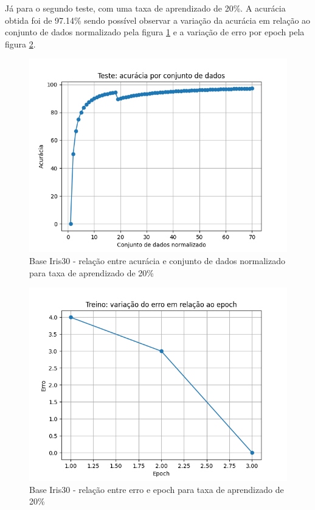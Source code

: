\documentclass[12pt, %
openright, 
oneside, %
a4paper,    %
brazil]{facom-ufu-abntex2}
\begin{document}
Já para o segundo teste, com uma taxa de aprendizado de 20\%. A acurácia obtida foi de 97.14\% sendo possível observar a variação da acurácia em relação ao conjunto de dados normalizado pela figura \ref{fig:9} e a variação de erro por epoch pela figura \ref{fig:10}.

\begin{figure}[H]
\centering
\includegraphics[scale=0.9]{figuras/acuracia_5.png}
\caption{Base Iris30 - relação entre acurácia e conjunto de dados normalizado para taxa de aprendizado de 20\%}
\label{fig:9}
\end{figure}

\begin{figure}[H]
\centering
\includegraphics[scale=0.9]{figuras/erro_5.png}
\caption{Base Iris30 - relação entre erro e epoch para taxa de aprendizado de 20\%}
\label{fig:10}
\end{figure}
\end{document}
